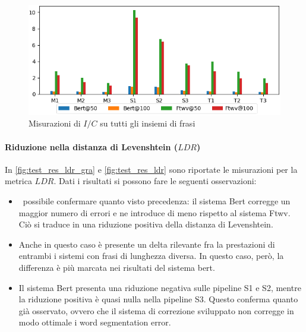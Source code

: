 \begin{figure}[H]
\centering
\includegraphics[width=\textwidth]{immagini/test/ic}
\caption{Misurazioni di $I/C$ su tutti gli insiemi di frasi}
\label{fig:test_res_ic}
\end{figure}


\paragraph{Riduzione nella distanza di Levenshtein ($LDR$)}
In \autoref{fig:test_res_ldr_gra} e \autoref{fig:test_res_ldr} sono riportate le misurazioni per la metrica $LDR$. Dati i risultati si possono fare le seguenti osservazioni:

\begin{itemize}
\item \E\ possibile confermare quanto visto precedenza: il sistema Bert corregge un maggior numero di errori e ne introduce di meno rispetto al sistema Ftwv. Ciò si traduce in una riduzione positiva della distanza di Levenshtein.
\item Anche in questo caso è presente un delta rilevante fra la prestazioni di entrambi i sistemi con frasi di lunghezza diversa. In questo caso, però, la differenza è più marcata nei risultati del sistema bert.

\item Il sistema Bert presenta una riduzione negativa sulle pipeline S1 e S2, mentre la riduzione positiva è quasi nulla nella pipeline S3. Questo conferma quanto già osservato, ovvero che il sistema di correzione sviluppato non corregge in modo ottimale i word segmentation error. 
\end{itemize}
\vfill
\newpage

